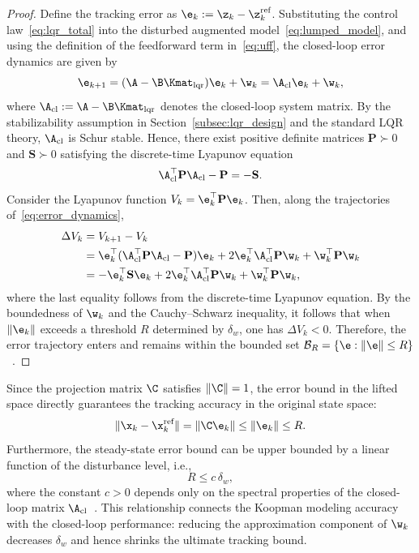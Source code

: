 \begin{proof}
Define the tracking error as $\e_k := \z_k - \z_k^{\text{ref}}$. Substituting the control law~\eqref{eq:lqr_total} into the disturbed augmented model~\eqref{eq:lumped_model}, and using the definition of the feedforward term in~\eqref{eq:uff}, the closed-loop error dynamics are given by
\begin{equation}
\label{eq:error_dynamics}
\e_{k+1} = (\A - \B\Kmat_{\text{lqr}})\e_k + \w_k = \A_{\text{cl}}\e_k + \w_k,
\end{equation}
where $\A_{\text{cl}} := \A - \B\Kmat_{\text{lqr}}$ denotes the closed-loop system matrix. By the stabilizability assumption in Section~\ref{subsec:lqr_design} and the standard LQR theory, $\A_{\text{cl}}$ is Schur stable. Hence, there exist positive definite matrices $\mathbf{P} \succ 0$ and $\mathbf{S} \succ 0$ satisfying the discrete-time Lyapunov equation
\[
\A_{\text{cl}}^\top \mathbf{P} \A_{\text{cl}} - \mathbf{P} = -\mathbf{S}.
\]
Consider the Lyapunov function $V_k = \e_k^\top \mathbf{P} \e_k$. Then, along the trajectories of~\eqref{eq:error_dynamics},
\begin{align}
\Delta V_k &= V_{k+1} - V_k \nonumber \\
&= \e_k^\top (\A_{\text{cl}}^\top \mathbf{P} \A_{\text{cl}} - \mathbf{P}) \e_k
+ 2\e_k^\top \A_{\text{cl}}^\top \mathbf{P}\w_k
+ \w_k^\top \mathbf{P}\w_k \nonumber \\
&= -\e_k^\top \mathbf{S} \e_k
+ 2\e_k^\top \A_{\text{cl}}^\top \mathbf{P}\w_k
+ \w_k^\top \mathbf{P}\w_k,
\end{align}
where the last equality follows from the discrete-time Lyapunov equation. By the boundedness of $\w_k$ and the Cauchy--Schwarz inequality, it follows that when $\|\e_k\|$ exceeds a threshold $R$ determined by $\delta_w$, one has $\Delta V_k < 0$. Therefore, the error trajectory enters and remains within the bounded set $\mathcal{B}_R = \{\e : \|\e\| \le R\}$~\cite{Blanchini2008,Khalil2002}.
\end{proof}

Since the projection matrix $\C$ satisfies $\|\C\| = 1$, the error bound in the lifted space directly guarantees the tracking accuracy in the original state space:
\[
\|\x_k - \x_k^{\text{ref}}\| = \|\C\e_k\| \le \|\e_k\| \le R.
\]
Furthermore, the steady-state error bound can be upper bounded by a linear function of the disturbance level, i.e.,
\[
R \le c\,\delta_w,
\]
where the constant $c > 0$ depends only on the spectral properties of the closed-loop matrix $\A_{\text{cl}}$~\cite{Blanchini2008}. This relationship connects the Koopman modeling accuracy with the closed-loop performance: reducing the approximation component of $\w_k$ decreases $\delta_w$ and hence shrinks the ultimate tracking bound.



